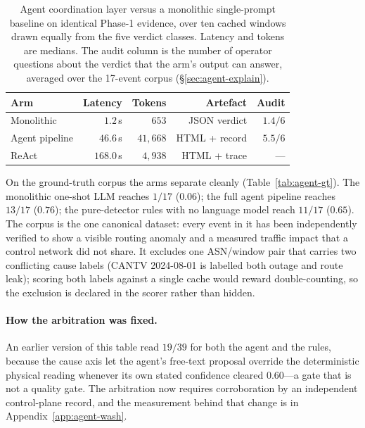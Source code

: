 \begin{table}[t]
\centering
\caption{Agent coordination layer versus a monolithic single-prompt
baseline on identical Phase-1 evidence, over ten cached windows drawn
equally from the five verdict classes. Latency and tokens are medians.
The audit column is the number of operator questions about the verdict
that the arm's output can answer, averaged over the 17-event corpus
(\S\ref{sec:agent-explain}).}
\label{tab:agent-ablation}
\small
\setlength{\tabcolsep}{4pt}
\begin{tabular}{@{}lrrrr@{}}
\hline
\textbf{Arm} & \textbf{Latency} & \textbf{Tokens} & \textbf{Artefact}
  & \textbf{Audit} \\
\hline
Monolithic     & $1.2$\,s   & $653$      & JSON verdict   & $1.4/6$ \\
Agent pipeline & $46.6$\,s & $41{,}668$ & HTML + record & $5.5/6$ \\
ReAct          & $168.0$\,s & $4{,}938$  & HTML + trace   & --- \\
\hline
\end{tabular}
\end{table}

On the ground-truth corpus the arms separate cleanly
(Table~\ref{tab:agent-gt}). The monolithic one-shot LLM reaches $1/17$
($0.06$); the full agent pipeline reaches $13/17$ ($0.76$); the
pure-detector rules with no language model reach $11/17$ ($0.65$). The
corpus is the one canonical dataset: every event in it has been
independently verified to show a visible routing anomaly and a measured
traffic impact that a control network did not share. It excludes one
ASN/window pair that carries two conflicting cause labels (CANTV
2024-08-01 is labelled both outage and route leak); scoring both labels
against a single cache would reward double-counting, so the exclusion is
declared in the scorer rather than hidden.

\paragraph{How the arbitration was fixed.}
An earlier version of this table read $19/39$ for both the agent and the
rules, because the cause axis let the agent's free-text proposal override
the deterministic physical reading whenever its own stated confidence
cleared $0.60$---a gate that is not a quality gate. The arbitration now
requires corroboration by an independent control-plane record, and the
measurement behind that change is in Appendix~\ref{app:agent-wash}.

